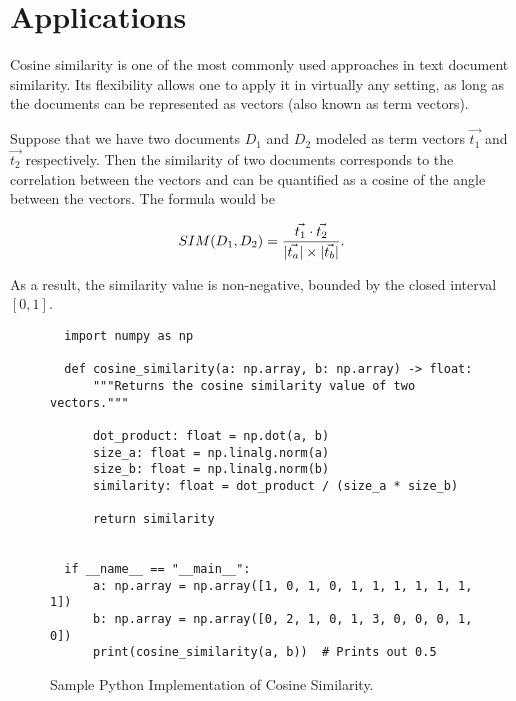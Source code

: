 \documentclass[11pt]{article}
\DeclarePairedDelimiter\abs{\lvert}{\rvert}               %
\begin{document}

\section{Applications}

Cosine similarity is one of the most commonly used approaches in text document
similarity. Its flexibility allows one to apply it in virtually any setting, as
long as the documents can be represented as vectors (also known as term
vectors).

\bigskip

Suppose that we have two documents \(D_1\) and \(D_2\) modeled as term vectors
\(\vec{t_1}\) and \(\vec{t_2}\) respectively. Then the similarity of two
documents corresponds to the correlation between the vectors and can be
quantified as a cosine of the angle between the vectors. The formula would be

\[SIM(D_1, D_2) = \dfrac{\vec{t_1} \cdot \vec{t_2}}{\abs{\vec{t_a}} \times
  \abs{\vec{t_b}}}.\]

As a result, the similarity value is non-negative, bounded by the closed
interval \([0,1]\).

\begin{figure}[H]
  \begin{verbatim}
  import numpy as np

  def cosine_similarity(a: np.array, b: np.array) -> float:
      """Returns the cosine similarity value of two vectors."""

      dot_product: float = np.dot(a, b)
      size_a: float = np.linalg.norm(a)
      size_b: float = np.linalg.norm(b)
      similarity: float = dot_product / (size_a * size_b)

      return similarity


  if __name__ == "__main__":
      a: np.array = np.array([1, 0, 1, 0, 1, 1, 1, 1, 1, 1, 1])
      b: np.array = np.array([0, 2, 1, 0, 1, 3, 0, 0, 0, 1, 0])
      print(cosine_similarity(a, b))  # Prints out 0.5
  \end{verbatim}
  \caption{Sample Python Implementation of Cosine Similarity.}
\end{figure}

\end{document}
